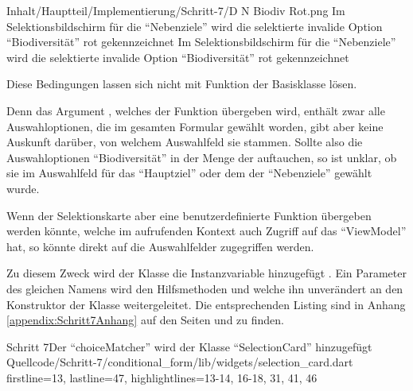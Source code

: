\begin{alexfigure}{Inhalt/Hauptteil/Implementierung/Schritt-7/D N Biodiv Rot.png}
  {Im Selektionsbildschirm für die \enquote{Nebenziele} wird die selektierte invalide Option \enquote{Biodiversität} rot gekennzeichnet}
  {Im Selektionsbildschirm für die \enquote{Nebenziele} wird die selektierte invalide Option \enquote{Biodiversität} rot gekennzeichnet}

  \label{fig:Schritt4EingabemaskeDNBiodivRot}

\end{alexfigure}




Diese Bedingungen lassen sich nicht mit Funktion  der Basisklasse  lösen.

Denn das Argument ,
welches der Funktion  übergeben wird,
enthält zwar alle Auswahloptionen,
die im gesamten Formular gewählt worden,
gibt aber keine Auskunft darüber,
von welchem Auswahlfeld sie stammen. 
Sollte also die Auswahloptionen \enquote{Biodiversität} in der Menge der  auftauchen,
so ist unklar,
ob sie im Auswahlfeld für das \enquote{Hauptziel} oder dem der \enquote{Nebenziele} gewählt wurde.

Wenn der Selektionskarte aber eine benutzerdefinierte Funktion übergeben werden könnte,
welche im aufrufenden Kontext auch Zugriff auf das \enquote{ViewModel} hat,
so könnte direkt auf die Auswahlfelder zugegriffen werden.


Zu diesem Zweck wird der Klasse  die Instanzvariable  hinzugefügt .
Ein Parameter des gleichen Namens wird den Hilfsmethoden  und  welche ihn unverändert an den Konstruktor der Klasse  weitergeleitet.
Die entsprechenden Listing sind in Anhang \ref{appendix:Schritt7Anhang} auf den Seiten \pageref{lst:Schritt7AppendixbuildSelectionCard} und \pageref{lst:Schritt7buildMultiSelectionCard} zu finden. 






\begin{alexlisting}{Schritt 7}{Der \enquote{choiceMatcher} wird der Klasse \enquote{SelectionCard} hinzugefügt}
  {Quellcode/Schritt-7/conditional_form/lib/widgets/selection_card.dart}
  {firstline=13, lastline=47, highlightlines={13-14, 16-18, 31, 41, 46}}
  \label{lst:Schritt7SelectionCard}
\end{alexlisting}

